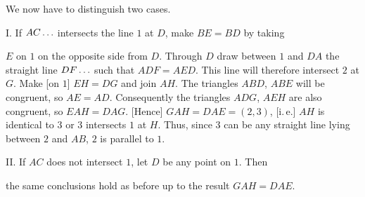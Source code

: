 We now have to distinguish two cases.

I. If $AC\mathinner{.\,.\,.}$ intersects the line $1$ at $D$, make $BE = BD$ by taking

\begin{center}

\end{center}
\noindent $E$ on $1$ on the opposite side from $D$. Through $D$ draw between $1$ and $DA$ the straight line $DF\mathinner{.\,.\,.}$ such that $ADF = AED$. This line will therefore intersect $2$ at $G$. Make [on $1$] $EH = DG$ and join $AH$. The triangles $ABD$, $ABE$ will be congruent, so $AE = AD$. Consequently the triangles $ADG$, $AEH$ are also congruent, so $EAH = DAG$. [Hence] $GAH = DAE = (2,3)$, [i.\,e.] $AH$ is identical to $3$ or $3$ intersects $1$ at $H$. Thus, since $3$ can be any straight line lying between $2$ and $AB$, $2$ is parallel to $1$.

II. If $AC$ does not intersect $1$, let $D$ be any point on $1$. Then

\begin{center}

\end{center}
\noindent the same conclusions hold as before up to the result $GAH = DAE$.
